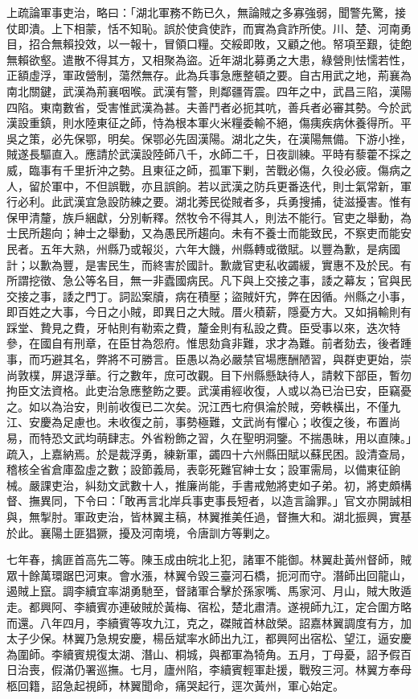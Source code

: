 \begin{pinyinscope}
上疏論軍事吏治，略曰：「湖北軍務不飭已久，無論賊之多寡強弱，聞警先驚，接仗即潰。上下相蒙，恬不知恥。誤於使貪使詐，而實為貪詐所使。川、楚、河南勇目，招合無賴投效，以一報十，冒領口糧。交綏即敗，又顧之他。帑項至艱，徒飽無賴欲壑。遣散不得其方，又相聚為盜。近年湖北募勇之大患，綠營則怯懦若性，正額虛浮，軍政營制，蕩然無存。此為兵事急應整頓之要。自古用武之地，荊襄為南北關鍵，武漢為荊襄咽喉。武漢有警，則鄰疆胥震。四年之中，武昌三陷，漢陽四陷。東南數省，受害惟武漢為甚。夫善鬥者必扼其吭，善兵者必審其勢。今於武漢設重鎮，則水陸東征之師，恃為根本軍火米糧委輸不絕，傷痍疾病休養得所。平吳之策，必先保鄂，明矣。保鄂必先固漢陽。湖北之失，在漢陽無備。下游小挫，賊遂長驅直入。應請於武漢設陸師八千，水師二千，日夜訓練。平時有藜藿不採之威，臨事有千里折沖之勢。且東征之師，孤軍下剿，苦戰必傷，久役必疲。傷病之人，留於軍中，不但誤戰，亦且誤餉。若以武漢之防兵更番迭代，則士氣常新，軍行必利。此武漢宜急設防練之要。湖北莠民從賊者多，兵勇搜捕，徒滋擾害。惟有保甲清釐，族戶綑獻，分別斬釋。然牧令不得其人，則法不能行。官吏之舉動，為士民所趨向；紳士之舉動，又為愚民所趨向。未有不養士而能致民，不察吏而能安民者。五年大熟，州縣乃或報災，六年大饑，州縣轉或徵賦。以豐為歉，是病國計；以歉為豐，是害民生，而終害於國計。歉歲官吏私收蠲緩，實惠不及於民。有所謂挖徵、急公等名目，無一非蠹國病民。凡下與上交接之事，諉之幕友；官與民交接之事，諉之門丁。詞訟案牘，病在積壓；盜賊奸宄，弊在因循。州縣之小事，即百姓之大事，今日之小賊，即異日之大賊。厝火積薪，隱憂方大。又如捐輸則有踩堂、贄見之費，牙帖則有勒索之費，釐金則有私設之費。臣受事以來，迭次特參，在國自有刑章，在臣甘為怨府。惟思劾貪非難，求才為難。前者劾去，後者踵事，而巧避其名，弊將不可勝言。臣愚以為必嚴禁官場應酬陋習，與群吏更始，崇尚敦樸，屏退浮華。行之數年，庶可改觀。目下州縣懸缺待人，請敕下部臣，暫勿拘臣文法資格。此吏治急應整飭之要。武漢甫經收復，人或以為已治已安，臣竊憂之。如以為治安，則前收復已二次矣。況江西七府俱淪於賊，旁軼橫出，不僅九江、安慶為足慮也。未收復之前，事勢極難，文武尚有懼心；收復之後，布置尚易，而特恐文武均萌肆志。外省粉飾之習，久在聖明洞鑒。不揣愚昧，用以直陳。」疏入，上嘉納焉。於是裁浮勇，練新軍，蠲四十六州縣田賦以蘇民困。設清查局，稽核全省倉庫盈虛之數；設節義局，表彰死難官紳士女；設軍需局，以備東征餉械。嚴課吏治，糾劾文武數十人，推廉尚能，手書戒勉將吏如子弟。初，將吏頗構督、撫異同，下令曰：「敢再言北岸兵事吏事長短者，以造言論罪。」官文亦開誠相與，無掣肘。軍政吏治，皆林翼主稿，林翼推美任過，督撫大和。湖北振興，實基於此。襄陽土匪猖獗，擾及河南境，令唐訓方等剿之。

七年春，擒匪首高先二等。陳玉成由皖北上犯，諸軍不能御。林翼赴黃州督師，賊眾十餘萬環踞巴河東。會水漲，林翼令毀三臺河石橋，扼河而守。潛師出回龍山，遏賊上竄。調李續宜率湖勇馳至，督諸軍合擊於孫家嘴、馬家河、月山，賊大敗遁走。都興阿、李續賓亦連破賊於黃梅、宿松，楚北肅清。遂視師九江，定合圍方略而還。八年四月，李續賓等攻九江，克之，磔賊首林啟榮。詔嘉林翼調度有方，加太子少保。林翼乃急規安慶，楊岳斌率水師出九江，都興阿出宿松、望江，逼安慶為圍師。李續賓規復太湖、潛山、桐城，與都軍為犄角。五月，丁母憂，詔予假百日治喪，假滿仍署巡撫。七月，廬州陷，李續賓輕軍赴援，戰歿三河。林翼方奉母柩回籍，詔急起視師，林翼聞命，痛哭起行，逕次黃州，軍心始定。


\end{pinyinscope}
